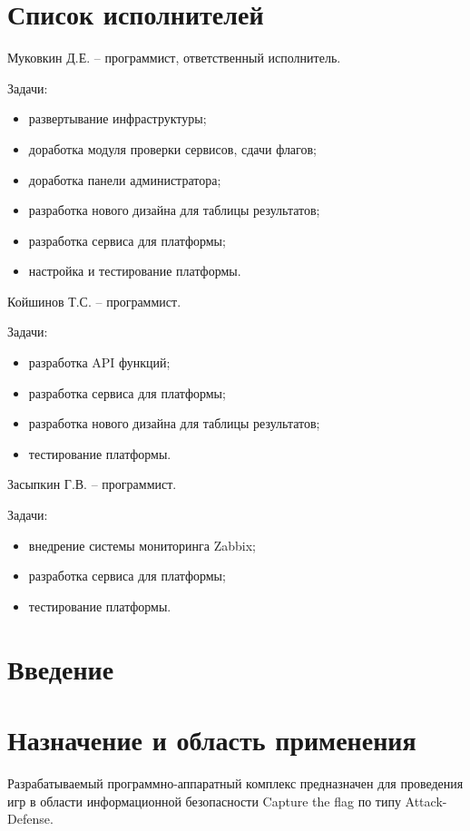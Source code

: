 


 
 
 
 \newpage
 \section*{Список исполнителей}

Муковкин Д.Е. -- программист, ответственный исполнитель.

Задачи:
\begin{itemize}
\item развертывание инфраструктуры;
\item доработка модуля проверки сервисов, сдачи флагов;
\item доработка панели администратора;
\item разработка нового дизайна для таблицы результатов;
\item разработка сервиса для платформы;
\item настройка и тестирование платформы.
\end{itemize}

Койшинов Т.С. -- программист.

Задачи:
\begin{itemize}
\item разработка API функций;
\item разработка сервиса для платформы;
\item разработка нового дизайна для таблицы результатов;
\item тестирование платформы.
\end{itemize}

Засыпкин Г.В. -- программист.

Задачи:
\begin{itemize}
\item внедрение системы мониторинга Zabbix;
\item разработка сервиса для платформы;
\item тестирование платформы.
\end{itemize}
 
 \newpage
 \tableofcontents

 \newpage
 \section*{Введение}
 
 \newpage
 \section{Назначение и область применения}
Разрабатываемый программно-аппаратный комплекс предназначен для проведения игр в области информационной безопасности Capture the flag по типу Attack-Defense.
